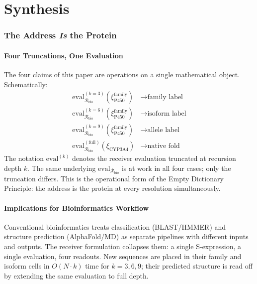 \documentclass[11pt,twocolumn,a4paper]{article}
\theoremstyle{definition}
\theoremstyle{remark}
\newcommand{\Recv}{\mathcal{R}}
\newcommand{\eval}{\mathrm{eval}}
\newcommand{\Sexp}{\xi}
\begin{document}
\part{Synthesis}

\section{The Address \emph{Is} the Protein}
\label{sec:unification}

\subsection{Four Truncations, One Evaluation}

The four claims of this paper are operations on a single mathematical object. Schematically:
\begin{align*}
\eval^{(k=3)}_{\Recv_{\mathrm{bio}}}(\Sexp_{\mathrm{P450}}^{\mathrm{family}}) &\to \text{family label} \\
\eval^{(k=6)}_{\Recv_{\mathrm{bio}}}(\Sexp_{\mathrm{P450}}^{\mathrm{family}}) &\to \text{isoform label} \\
\eval^{(k=9)}_{\Recv_{\mathrm{bio}}}(\Sexp_{\mathrm{P450}}^{\mathrm{family}}) &\to \text{allele label} \\
\eval^{(\mathrm{full})}_{\Recv_{\mathrm{bio}}}(\Sexp_{\mathrm{CYP3A4}}) &\to \text{native fold}
\end{align*}
The notation $\eval^{(k)}$ denotes the receiver evaluation truncated at recursion depth $k$. The same underlying $\eval_{\Recv_{\mathrm{bio}}}$ is at work in all four cases; only the truncation differs. This is the operational form of the Empty Dictionary Principle: the address is the protein at every resolution simultaneously.

\subsection{Implications for Bioinformatics Workflow}

Conventional bioinformatics treats classification (BLAST/HMMER) and structure prediction (AlphaFold/MD) as separate pipelines with different inputs and outputs. The receiver formulation collapses them: a single S-expression, a single evaluation, four readouts. New sequences are placed in their family and isoform cells in $O(N \cdot k)$ time for $k = 3, 6, 9$; their predicted structure is read off by extending the same evaluation to full depth.
\end{document}
